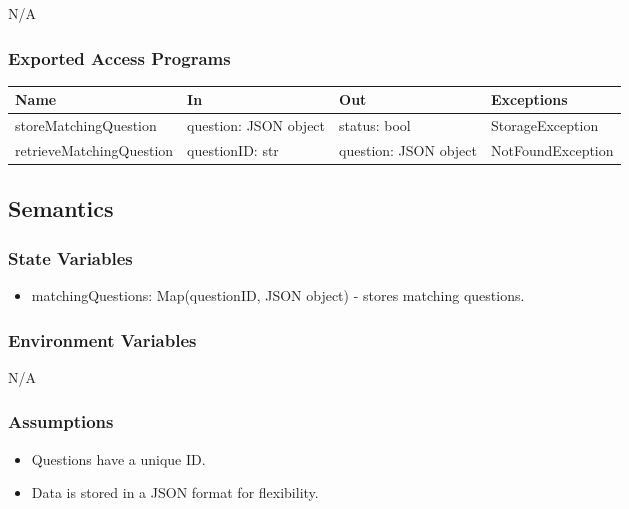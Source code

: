 \documentclass[12pt, titlepage]{article}
\begin{document}
N/A

\subsubsection{Exported Access Programs}

\begin{center}
\begin{tabular}{p{5cm} p{3cm} p{3cm} p{5cm}}
\hline
\textbf{Name} & \textbf{In} & \textbf{Out} & \textbf{Exceptions} \\
\hline
storeMatchingQuestion & \raggedright\arraybackslash question: JSON object & \raggedright\arraybackslash status: bool & \raggedright\arraybackslash StorageException \\
\hline
retrieveMatchingQuestion & \raggedright\arraybackslash questionID: str & \raggedright\arraybackslash question: JSON object & \raggedright\arraybackslash NotFoundException \\
\hline
\end{tabular}
\end{center}

\subsection{Semantics}

\subsubsection{State Variables}

\begin{itemize}
  \item matchingQuestions: Map(questionID, JSON object) - stores matching questions.
\end{itemize}

\subsubsection{Environment Variables}

N/A

\subsubsection{Assumptions}

\begin{itemize}
  \item Questions have a unique ID.
  \item Data is stored in a JSON format for flexibility.
\end{itemize}
\end{document}
